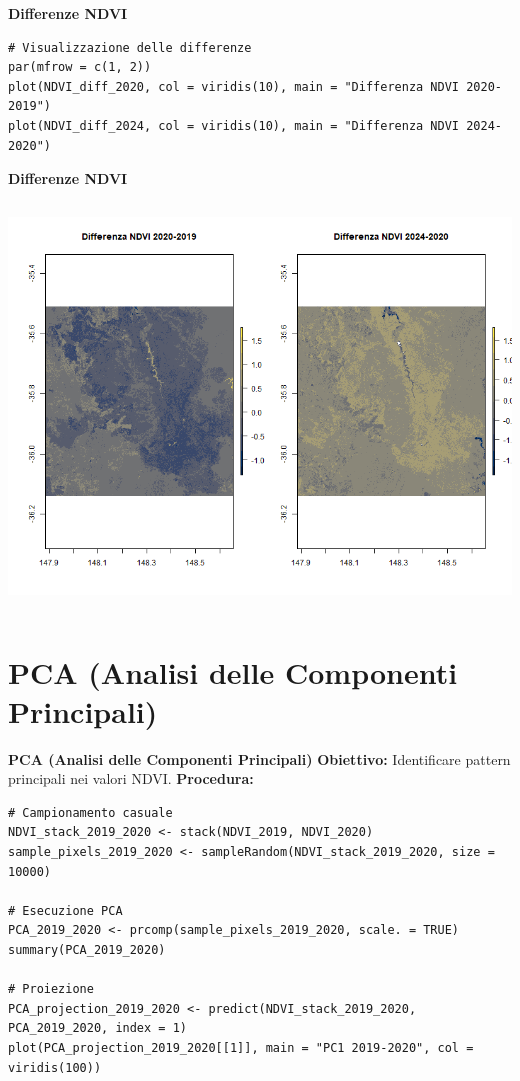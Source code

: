 \documentclass{beamer}
\begin{document}
\begin{frame}[fragile]{\textbf{Differenze NDVI}}
\begin{lstlisting}
# Visualizzazione delle differenze
par(mfrow = c(1, 2))
plot(NDVI_diff_2020, col = viridis(10), main = "Differenza NDVI 2020-2019")
plot(NDVI_diff_2024, col = viridis(10), main = "Differenza NDVI 2024-2020")
\end{lstlisting}
\end{frame}

\begin{frame}{\textbf{Differenze NDVI}}
\begin{columns}
    \centering
    \includegraphics[width=\textwidth]{NDVI_diff.png}
\end{columns}
\end{frame}

\section{PCA (Analisi delle Componenti Principali)}

\begin{frame}[fragile]{\textbf{PCA (Analisi delle Componenti Principali)}}
\textbf{Obiettivo:} Identificare pattern principali nei valori NDVI.
\newline
\newline
\textbf{Procedura:}
\begin{lstlisting}
# Campionamento casuale
NDVI_stack_2019_2020 <- stack(NDVI_2019, NDVI_2020)
sample_pixels_2019_2020 <- sampleRandom(NDVI_stack_2019_2020, size = 10000)

# Esecuzione PCA
PCA_2019_2020 <- prcomp(sample_pixels_2019_2020, scale. = TRUE)
summary(PCA_2019_2020)

# Proiezione
PCA_projection_2019_2020 <- predict(NDVI_stack_2019_2020, PCA_2019_2020, index = 1)
plot(PCA_projection_2019_2020[[1]], main = "PC1 2019-2020", col = viridis(100))
\end{lstlisting}
\end{frame}
\end{document}

